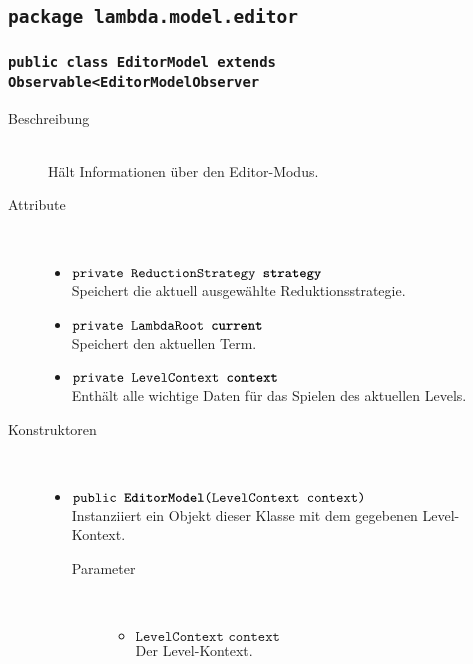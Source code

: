 \subsection{\texttt{package lambda.model.editor}}

\subsubsection{\normalfont \texttt{public class \textbf{EditorModel} extends Observable<EditorModelObserver}}

\begin{description}
\item[Beschreibung] \hfill \\ Hält Informationen über den Editor-Modus.

\item[Attribute] \hfill \\
	\vspace{-.8cm}
	\begin{itemize}
		\item $\texttt{private ReductionStrategy \textbf{strategy}}$ \\ Speichert die aktuell ausgewählte Reduktionsstrategie.
		\item $\texttt{private LambdaRoot \textbf{current}}$ \\ Speichert den aktuellen Term.
		\item $\texttt{private LevelContext \textbf{context}}$ \\ Enthält alle wichtige Daten für das Spielen des aktuellen Levels.
	\end{itemize}
	
\item[Konstruktoren] \hfill \\
	\vspace{-.8cm}
	\begin{itemize}
		\item $\texttt{public \textbf{EditorModel}(LevelContext context)}$ \\ Instanziiert ein Objekt dieser Klasse mit dem gegebenen Level-Kontext.
		\begin{description}
			\item[Parameter] \hfill \\
			\vspace{-.8cm}
			\begin{itemize}
				\item $\texttt{LevelContext context}$ \\ Der Level-Kontext.
			\end{itemize}
		\end{description}
	\end{itemize}
	

\end{description}
